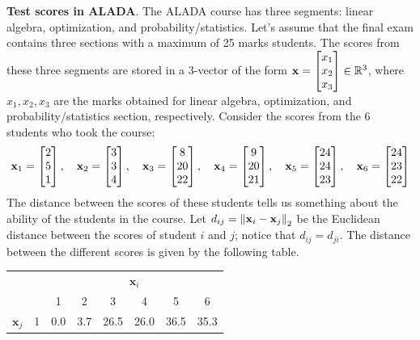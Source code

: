 \begin{boxedstuff}
    \begin{example}
        \textbf{Test scores in ALADA}. The ALADA course has three segments: linear algebra, optimization, and probability/statistics. Let's assume that the final exam contains three sections with a maximum of 25 marks students. The scores from these three segments are stored in a $3$-vector of the form $\mf{x} = \bmxc x_1 \\ x_2 \\ x_3\emx \in \mb{R}^3$, where $x_1, x_2, x_3$ are the marks obtained for linear algebra, optimization, and probability/statistics section, respectively. Consider the scores from the 6 students who took the course:
        \[ \mf{x}_1 = \bmxc 2 \\ 5 \\ 1 \emx, \quad \mf{x}_2 = \bmxc 3 \\ 3 \\ 4 \emx, \quad \mf{x}_3 = \bmxc 8 \\ 20 \\ 22 \emx, \quad \mf{x}_4 = \bmxc 9 \\ 20 \\ 21 \emx, \quad \mf{x}_5 = \bmxc 24 \\ 24 \\ 23 \emx, \quad \mf{x}_6 = \bmxc 24 \\ 23 \\ 22 \emx
        \]
        The distance between the scores of these students tells us something about the ability of the students in the course. Let $d_{ij} = \left\lVert \mathbf{x}_i - \mathbf{x}_j \right\rVert_2$ be the Euclidean distance between the scores of student $i$ and $j$; notice that $d_{ij} = d_{ji}$. The distance between the different scores is given by the following table. \\
        \begin{small}
            \begin{center}
            \begin{tabular}{lc|cccccc|}
                \cline{3-8}
                & \multicolumn{1}{l|}{} & \multicolumn{6}{c|}{$\mathbf{x}_i$} \\ \cline{3-8} 
                &  & \multicolumn{1}{c|}{1} & \multicolumn{1}{c|}{2} & \multicolumn{1}{c|}{3} & \multicolumn{1}{c|}{4} & \multicolumn{1}{c|}{5} & 6 \\ \hline
                \multicolumn{1}{|l|}{\multirow{6}{*}{$\mathbf{x}_j$}} & 1 & \multicolumn{1}{c|}{0.0} & \multicolumn{1}{c|}{3.7} & \multicolumn{1}{c|}{26.5} & \multicolumn{1}{c|}{26.0} & \multicolumn{1}{c|}{36.5} & 35.3 \\ \cline{2-8} 

\end{tabular}
\end{center}
\end{small}
\end{example}
\end{boxedstuff}
